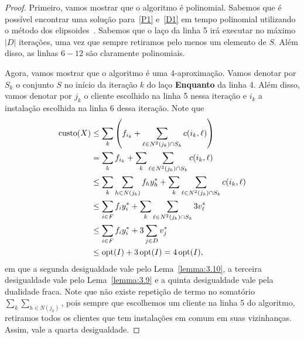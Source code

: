 \begin{proof}
    Primeiro, vamos mostrar que o algoritmo é polinomial. Sabemos que é possível encontrar uma solução para~\eqref{P1} e~\eqref{D1} em tempo polinomial utilizando o método dos elipsoides~\cite{Kha79}. Sabemos que o laço da linha 5 irá executar no máximo $|D|$ iterações, uma vez que sempre retiramos pelo menos um elemento de $S$. Além disso, as linhas $6-12$ são claramente polinomiais.
    
    Agora, vamos mostrar que o algoritmo é uma $4$-aproximação.
    Vamos denotar por $S_k$ o conjunto $S$ no início da iteração $k$ do laço {\bf Enquanto} da linha 4. Além disso, vamos denotar por $j_k$ o cliente escolhido na linha 5 nessa iteração e $i_k$ a instalação escolhida na linha 6 dessa iteração. Note que 
    \begin{align}
        \text{custo}(X) &\leq \sum_{k} \left( {f_{i_k} + \sum_{\ell \in N^2(j_k) \cap S_k} c(i_k,\ell}) \right) \nonumber \\
        &= \sum_k f_{i_k} + \sum_k \sum_{\ell \in N^2(j_k)\cap S_k} c(i_k, \ell)  \nonumber \\
        & \leq \sum_k \sum_{h \in N(j_k)} f_hy_h^* + \sum_k \sum_{\ell \in N^2(j_k)\cap S_k} c(i_k, \ell) \nonumber \\
        & \leq \sum_{i \in F} f_i y_i^* + \sum_k \sum_{\ell \in N^2(j_k)\cap S_k} 3 v_\ell^* \nonumber \\
        & \leq \sum_{i \in F} f_i y_i^* + 3 \sum_{j \in D}  v_j^* \nonumber \\
        & \leq \mathrm{opt}(I) + 3\,\mathrm{opt}(I) = 4\,\mathrm{opt}(I), \nonumber
    \end{align}
    em que a segunda desigualdade vale pelo Lema~\ref{lemma:3.10}, a terceira desigualdade vale pelo Lema~\ref{lemma:3.9} e a quinta desigualdade vale pela dualidade fraca. Note que não existe repetição de termo no somatório $\sum_{k} \sum_{h \in N(j_k)}$, pois sempre que escolhemos um cliente na linha 5 do algoritmo, retiramos todos os clientes que tem instalações em comum em suas vizinhanças. Assim, vale a quarta desigualdade.


\end{proof}
